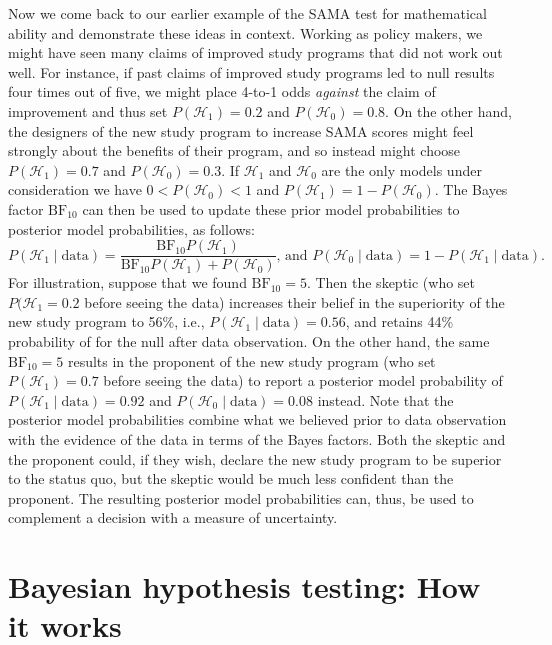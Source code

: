 \documentclass[english,,doc,floatsintext]{apa6}
\begin{document}
Now we come back to our earlier example of the SAMA test for mathematical ability and demonstrate these ideas in context. Working as policy makers, we might have seen many claims of improved study programs that did not work out well. For instance, if past claims of improved study programs led to null results four times out of five, we might place 4-to-1 odds \emph{against} the claim of improvement and thus set \(P( \mathcal{H}_{1}) = 0.2\) and \(P(\mathcal{H}_{0}) = 0.8\). On the other hand, the designers of the new study program to increase SAMA scores might feel strongly about the benefits of their program, and so instead might choose \(P( \mathcal{H}_{1}) = 0.7\) and \(P(\mathcal{H}_{0}) = 0.3\). If \(\mathcal{H}_{1}\) and \(\mathcal{H}_{0}\) are the only models under consideration we have \(0 < P( \mathcal{H}_{0}) < 1\) and \(P( \mathcal{H}_{1})= 1 - P( \mathcal{H}_{0})\). The Bayes factor \(\text{BF}_{10}\) can then be used to update these prior model probabilities to posterior model probabilities, as follows:
\[
P(\mathcal{H}_{1} \mid \text{data}) = \frac{ \text{BF}_{10} P(\mathcal{H}_{1})}{\text{BF}_{10} P(\mathcal{H}_{1}) + P(\mathcal{H}_{0})} \text{, and } P(\mathcal{H}_{0} \mid \text{data}) = 1 - P(\mathcal{H}_{1} \mid \text{data}).
\]
For illustration, suppose that we found \(\text{BF}_{10} = 5\). Then the skeptic (who set \(P(\mathcal{H}_1=0.2\) before seeing the data) increases their belief in the superiority of the new study program to 56\%, i.e., \(P(\mathcal{H}_{1} \mid \text{data})=0.56\), and retains 44\% probability of for the null after data observation. On the other hand, the same \(\text{BF}_{10} = 5\) results in the proponent of the new study program (who set \(P(\mathcal{H}_1)=0.7\) before seeing the data) to report a posterior model probability of \(P(\mathcal{H}_{1} \mid \text{data})=0.92\) and \(P(\mathcal{H}_{0} \mid \text{data})=0.08\) instead. Note that the posterior model probabilities combine what we believed prior to data observation with the evidence of the data in terms of the Bayes factors. Both the skeptic and the proponent could, if they wish, declare the new study program to be superior to the status quo, but the skeptic would be much less confident than the proponent. The resulting posterior model probabilities can, thus, be used to complement a decision with a measure of uncertainty.

\hypertarget{bayesian-hypothesis-testing-how-it-works}{%
\section{Bayesian hypothesis testing: How it works}\label{bayesian-hypothesis-testing-how-it-works}}
\end{document}
